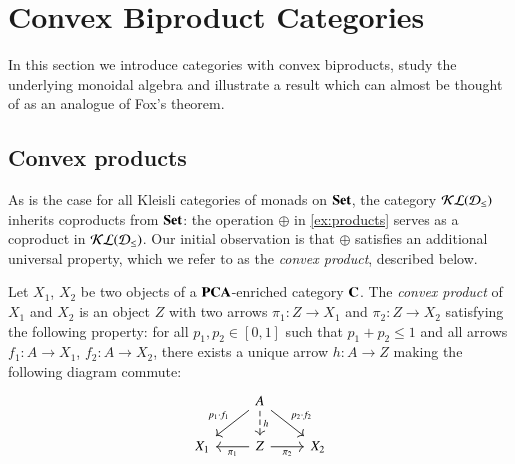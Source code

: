 
\section{Convex Biproduct Categories}\label{sec:cbproducts}  
In this section we introduce categories with convex biproducts, study the underlying monoidal algebra and illustrate a result which can almost be thought of as an analogue of Fox's theorem.


\subsection{Convex products}\label{ssec:convexproducts} As is the case for all Kleisli categories of monads on $\mathbf{Set}$, the category $\mathcal{KL}(\mathcal{D}_{\leq})$ inherits coproducts from $\mathbf{Set}$: the operation $\oplus$  in \eqref{ex:products} serves as a coproduct in $\mathcal{KL}(\mathcal{D}_{\leq})$. Our initial observation is that $\oplus$ satisfies an additional universal property, which we refer to as the \emph{convex product}, described below.


\begin{definition}\label{def:convprod}
Let $X_1$, $X_2$  be two objects of a $\mathbf{PCA}$-enriched category $\mathbf{C}$. The \emph{convex product} of $X_1$ and $X_2$ is an object $Z$ with two arrows $\pi_1\colon Z\to X_1$ and $\pi_2\colon Z\to X_2$ satisfying the following property: for all $p_1,p_2 \in [0,1]$ such that $p_1+p_2\le 1$ and all arrows $f_1\colon A\to X_1$, $f_2\colon A \to X_2$, there exists a unique arrow $h \colon A \to Z$ %
making the following diagram commute: %
\[\begin{tikzcd}
	& A \\
	{X_1} & Z & {X_2}
	\arrow["{p_1\cdot f_1}"', from=1-2, to=2-1]
	\arrow["h", dashed, from=1-2, to=2-2]
	\arrow["{p_2\cdot f_2}", from=1-2, to=2-3]
	\arrow["{\pi_1}", from=2-2, to=2-1]
	\arrow["{\pi_2}"', from=2-2, to=2-3]
\end{tikzcd}\]
\end{definition}

